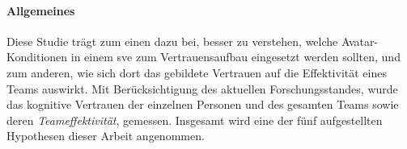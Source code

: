 \documentclass[a4paper,11pt]{article}%
\renewcommand{\\}{\vspace*{0.5\baselineskip} \newline}
\begin{document}
{{%
%	
%
%
%
%
%
%
	

\paragraph{Allgemeines}
	Diese Studie trägt zum einen dazu bei, besser zu verstehen, welche Avatar- Konditionen in einem \ac{sve} zum Vertrauensaufbau eingesetzt werden sollten, und zum anderen, wie sich dort das gebildete Vertrauen auf die Effektivität eines Teams auswirkt. Mit Berücksichtigung des aktuellen Forschungsstandes, wurde das kognitive Vertrauen der einzelnen Personen und des gesamten Teams sowie deren \textit{Teameffektivität}, gemessen. Insgesamt wird eine der fünf aufgestellten Hypothesen dieser Arbeit angenommen.







}}
\end{document}
